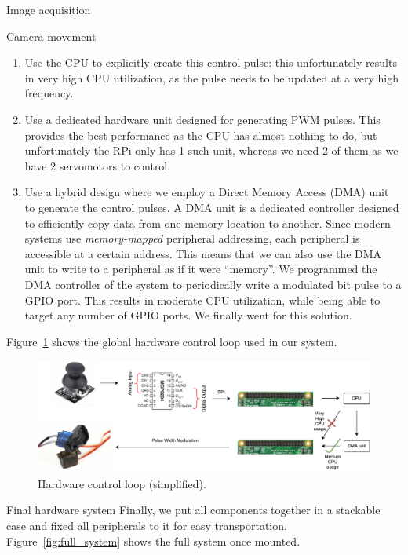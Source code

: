 \documentclass[10pt]{article}
\begin{document}
\begin{section}{Image acquisition}
\begin{subsubsection}{Camera movement}
        \begin{enumerate}
            \item Use the CPU to explicitly create this control pulse: this unfortunately results in very high CPU utilization, as the pulse needs to be updated at a very high frequency.
            \item Use a dedicated hardware unit designed for generating PWM pulses. This provides the best performance as the CPU has almost nothing to do, but unfortunately the RPi only has 1 such unit, whereas we need 2 of them as we have 2 servomotors to control.
            \item Use a hybrid design where we employ a Direct Memory Access (DMA) unit to generate the control pulses. A DMA unit is a dedicated controller designed to efficiently copy data from one memory location to another. Since modern systems use \emph{memory-mapped} peripheral addressing, each peripheral is accessible at a certain address. This means that we can also use the DMA unit to write to a peripheral as if it were ``memory''. We programmed the DMA controller of the system to periodically write a modulated bit pulse to a GPIO port. This results in moderate CPU utilization, while being able to target any number of GPIO ports. We finally went for this solution.
        \end{enumerate}

        Figure~\ref{fig:servomotor_control_loop} shows the global hardware control loop used in our system.

        \begin{figure}[!h]
            \begin{center}
                \includegraphics[width=\textwidth]{fig/rpi_wiring.pdf}
                \caption{Hardware control loop (simplified).}
                \label{fig:servomotor_control_loop}
            \end{center}
        \end{figure}
    \end{subsubsection}

    \begin{subsubsection}{Final hardware system}
        Finally, we put all components together in a stackable case and fixed all peripherals to it for easy transportation. Figure~\ref{fig:full_system} shows the full system once mounted.


\end{subsubsection}
\end{section}
\end{document}

